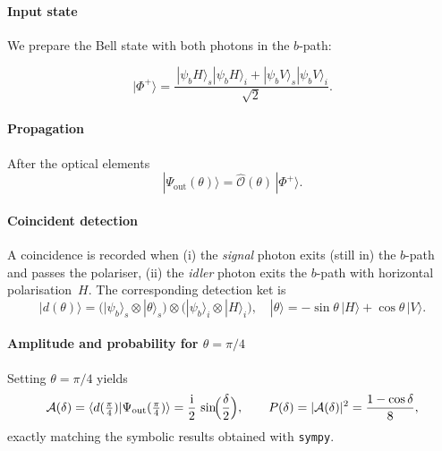 \documentclass{article}
\begin{document}
\paragraph{Input state}

We prepare the Bell state with both photons in the \(b\)-path:

\[
|\Phi^{+}\rangle=
\frac{\,|\psi_bH\rangle_{\!s}|\psi_bH\rangle_{\!i}
      +|\psi_bV\rangle_{\!s}|\psi_bV\rangle_{\!i}}{\sqrt{2}}.
\]

\paragraph{Propagation}

After the optical elements
\[
|\Psi_{\mathrm{out}}(\theta)\rangle
=\hat{\mathcal{O}}(\theta)\,|\Phi^{+}\rangle.
\]

\paragraph{Coincident detection}

A coincidence is recorded when
(i) the \emph{signal} photon exits (still in) the \(b\)-path and passes the polariser,
(ii) the \emph{idler} photon exits the \(b\)-path with horizontal polarisation~\(H\).
The corresponding detection ket is
\[
|d(\theta)\rangle=
\bigl(|\psi_b\rangle_{\!s}\otimes|{\theta}\rangle_{\!s}\bigr)
\otimes
\bigl(|\psi_b\rangle_{\!i}\otimes|H\rangle_{\!i}\bigr),
\quad
|{\theta}\rangle=-\sin\theta\,|H\rangle+\cos\theta\,|V\rangle.
\]

\paragraph{Amplitude and probability for \(\theta=\pi/4\)}

Setting \(\theta=\pi/4\) yields
\[
\mathcal{A}(\delta)=
\langle d(\tfrac{\pi}{4})|
      \Psi_{\mathrm{out}}(\tfrac{\pi}{4})\rangle
      =\frac{\mathrm{i}}{2}\,
        \sin\!\Bigl(\frac{\delta}{2}\Bigr),
\qquad
P(\delta)=|\mathcal{A}(\delta)|^{2}
        =\frac{1-\cos\delta}{8},
\]
exactly matching the symbolic results obtained with \texttt{sympy}.
\end{document}
